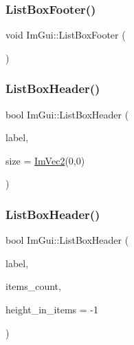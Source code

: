 \hypertarget{namespace_im_gui_a9a0a8f6a4a67280dce7bd91310a83a03}{}\label{namespace_im_gui_a9a0a8f6a4a67280dce7bd91310a83a03} 
\subsubsection{\texorpdfstring{List\+Box\+Footer()}{ListBoxFooter()}}
{\footnotesize\ttfamily void Im\+Gui\+::\+List\+Box\+Footer (\begin{DoxyParamCaption}{ }\end{DoxyParamCaption})}

\hypertarget{namespace_im_gui_a4003d6a6ab57f2fb43db80c6339a1aed}{}\label{namespace_im_gui_a4003d6a6ab57f2fb43db80c6339a1aed} 
\subsubsection{\texorpdfstring{List\+Box\+Header()}{ListBoxHeader()}\hspace{0.1cm}{\footnotesize\ttfamily [1/2]}}
{\footnotesize\ttfamily bool Im\+Gui\+::\+List\+Box\+Header (\begin{DoxyParamCaption}\item[{const char $\ast$}]{label,  }\item[{const \hyperlink{struct_im_vec2}{Im\+Vec2} \&}]{size = {\ttfamily \hyperlink{struct_im_vec2}{Im\+Vec2}(0,0)} }\end{DoxyParamCaption})}

\hypertarget{namespace_im_gui_a6c5c48e5e5b90365f3f6faaa3307af26}{}\label{namespace_im_gui_a6c5c48e5e5b90365f3f6faaa3307af26} 
\subsubsection{\texorpdfstring{List\+Box\+Header()}{ListBoxHeader()}\hspace{0.1cm}{\footnotesize\ttfamily [2/2]}}
{\footnotesize\ttfamily bool Im\+Gui\+::\+List\+Box\+Header (\begin{DoxyParamCaption}\item[{const char $\ast$}]{label,  }\item[{int}]{items\+\_\+count,  }\item[{int}]{height\+\_\+in\+\_\+items = {\ttfamily -\/1} }\end{DoxyParamCaption})}

